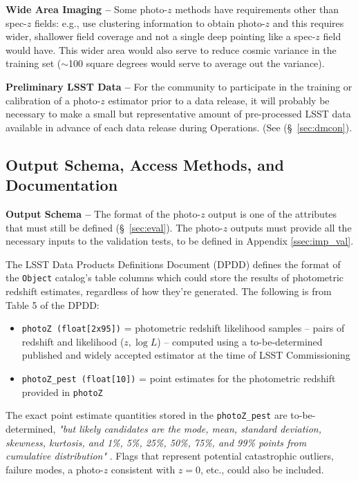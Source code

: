 \documentclass[DM,authoryear,toc]{lsstdoc}
\begin{document}
{\bf Wide Area Imaging --} 
Some photo-$z$ methods have requirements other than spec-$z$ fields: e.g., \citet{2019MNRAS.483.2801S} use clustering information to obtain photo-$z$ and this requires wider, shallower field coverage and not a single deep pointing like a spec-$z$ field would have. 
This wider area would also serve to reduce cosmic variance in the training set ($\sim$100 square degrees would serve to average out the variance).

{\bf Preliminary LSST Data --}
For the community to participate in the training or calibration of a photo-$z$ estimator prior to a data release, it will probably be necessary to make a small but representative amount of pre-processed LSST data available in advance of each data release during Operations. (See (\S~\ref{sec:dmcon}).

\subsection{Output Schema, Access Methods, and Documentation}\label{ssec:dp_pz}

{\bf Output Schema --} 
The format of the photo-$z$ output is one of the attributes that must still be defined (\S~\ref{sec:eval}). 
The photo-$z$ outputs must provide all the necessary inputs to the validation tests, to be defined in Appendix \ref{ssec:imp_val}.

The LSST Data Products Definitions Document (DPDD)  defines the format of the {\tt Object} catalog's table columns which could store the results of photometric redshift estimates, regardless of how they're generated. 
The following is from Table 5 of the DPDD:
\vspace{-15pt}
\begin{itemize}
\item \texttt{photoZ (float[2x95])} = photometric redshift likelihood samples -- pairs of redshift and likelihood ($z,\log{L}$) -- computed using a to-be-determined published and widely accepted estimator at the time of LSST Commissioning
\item \texttt{photoZ\_pest (float[10])} = point estimates for the photometric redshift provided in {\tt photoZ}
\end{itemize}

The exact point estimate quantities stored in the \texttt{photoZ\_pest} are to-be-determined, {\it "but likely candidates are the mode, mean, standard deviation, skewness, kurtosis, and 1\%, 5\%, 25\%, 50\%, 75\%, and 99\% points from cumulative distribution"} . 
Flags that represent potential catastrophic outliers, failure modes, a photo-$z$ consistent with $z=0$, etc., could also be included.
\end{document}
